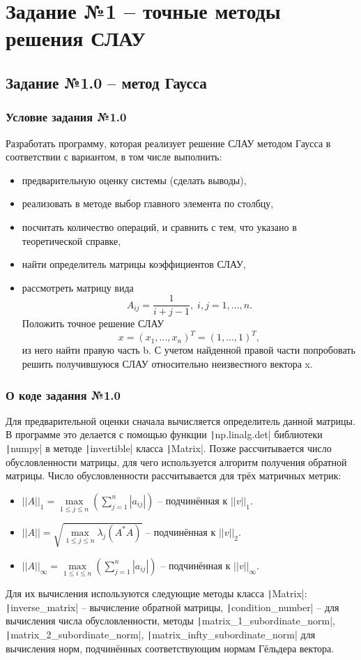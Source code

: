 \chapter{Задание №1 -- точные методы решения СЛАУ}
\section{Задание №1.0 -- метод Гаусса}
\subsection{Условие задания №1.0}
Разработать программу, которая реализует решение СЛАУ методом Гаусса в соответствии с вариантом, в том числе выполнить:
\begin{itemize}
\item предварительную оценку системы (сделать выводы),
\item реализовать в методе выбор главного элемента по столбцу,
\item посчитать количество операций, и сравнить с тем, что указано в теоретической справке,
\item найти определитель матрицы коэффициентов СЛАУ,
\item рассмотреть матрицу вида $$A_{ij}=\frac1{i+j-1},\; i,j=1,...,n.$$
    Положить точное решение СЛАУ $$x=(x_1,...,x_n)^T=(1,...,1)^T,$$ из него найти правую часть b. С учетом найденной правой части
попробовать решить получившуюся СЛАУ относительно неизвестного вектора x.
\end{itemize}

\subsection{О коде задания №1.0}
Для предварительной оценки сначала вычисляется определитель данной матрицы. В программе это делается с помощью функции \texttt|np.linalg.det| библиотеки \texttt|numpy| в методе \texttt|invertible| класса \texttt|Matrix|. Позже рассчитывается число обусловленности матрицы, для чего используется алгоритм получения обратной матрицы. Число обусловленности рассчитывается для трёх матричных метрик:
\begin{itemize}
\item $||A||_1=\max\limits_{1\leq j\leq n}
(\sum\limits_{j=1}^n|a_{ij}|)$ -- подчинённая к $||v||_1$.

\item $||A||=\sqrt{\max\limits_{1\leq j\leq n}
\lambda_j(A^*A)}$ -- подчинённая к $||v||_2$.

\item $||A||_\infty=\max\limits_{1\leq i\leq n}
(\sum\limits_{j=1}^n|a_{ij}|)$ -- подчинённая к $||v||_\infty$.
\end{itemize}
Для их вычисления используются следующие методы класса \texttt|Matrix|: \texttt|inverse_matrix| -- вычисление обратной матрицы, \texttt|condition_number| -- для вычисления числа обусловленности, методы \texttt|matrix_1_subordinate_norm|, \texttt|matrix_2_subordinate_norm|, \texttt|matrix_infty_subordinate_norm| для вычисления норм, подчинённых соответствующим нормам Гёльдера вектора.


